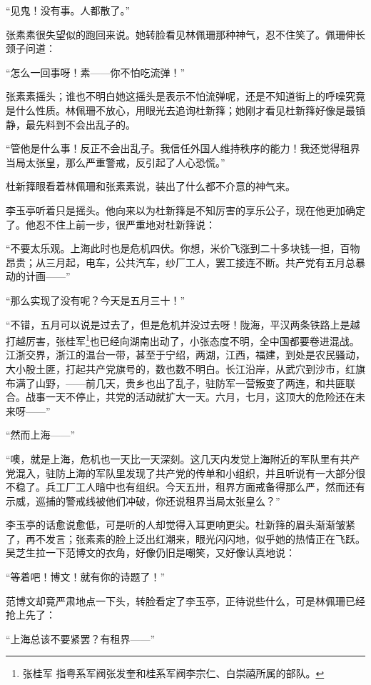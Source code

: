 \par “见鬼！没有事。人都散了。”
\par 张素素很失望似的跑回来说。她转脸看见林佩珊那种神气，忍不住笑了。佩珊伸长颈子问道：
\par “怎么一回事呀！素——你不怕吃流弹！”
\par 张素素摇头；谁也不明白她这摇头是表示不怕流弹呢，还是不知道街上的呼噪究竟是什么性质。林佩珊不放心，用眼光去追询杜新箨；她刚才看见杜新箨好像是最镇静，最先料到不会出乱子的。
\par “管他是什么事！反正不会出乱子。我信任外国人维持秩序的能力！我还觉得租界当局太张皇，那么严重警戒，反引起了人心恐慌。”
\par 杜新箨眼看着林佩珊和张素素说，装出了什么都不介意的神气来。
\par 李玉亭听着只是摇头。他向来以为杜新箨是不知厉害的享乐公子，现在他更加确定了。他忍不住上前一步，很严重地对杜新箨说：
\par “不要太乐观。上海此时也是危机四伏。你想，米价飞涨到二十多块钱一担，百物昂贵；从三月起，电车，公共汽车，纱厂工人，罢工接连不断。共产党有五月总暴动的计画——”
\par “那么实现了没有呢？今天是五月三十！”
\par “不错，五月可以说是过去了，但是危机并没过去呀！陇海，平汉两条铁路上是越打越厉害，张桂军\footnote{张桂军 指粤系军阀张发奎和桂系军阀李宗仁、白崇禧所属的部队。}也已经向湖南出动了，小张态度不明，全中国都要卷进混战。江浙交界，浙江的温台一带，甚至于宁绍，两湖，江西，福建，到处是农民骚动，大小股土匪，打起共产党旗号的，数也数不明白。长江沿岸，从武穴到沙市，红旗布满了山野，——前几天，贵乡也出了乱子，驻防军一营叛变了两连，和共匪联合。战事一天不停止，共党的活动就扩大一天。六月，七月，这顶大的危险还在未来呀——”
\par “然而上海——”
\par “噢，就是上海，危机也一天比一天深刻。这几天内发觉上海附近的军队里有共产党混入，驻防上海的军队里发现了共产党的传单和小组织，并且听说有一大部分很不稳了。兵工厂工人暗中也有组织。今天五卅，租界方面戒备得那么严，然而还有示威，巡捕的警戒线被他们冲破，你还说租界当局太张皇么？”
\par 李玉亭的话愈说愈低，可是听的人却觉得入耳更响更尖。杜新箨的眉头渐渐皱紧了，再不发言；张素素的脸上泛出红潮来，眼光闪闪地，似乎她的热情正在飞跃。吴芝生拉一下范博文的衣角，好像仍旧是嘲笑，又好像认真地说：
\par “等着吧！博文！就有你的诗题了！”
\par 范博文却竟严肃地点一下头，转脸看定了李玉亭，正待说些什么，可是林佩珊已经抢上先了：
\par “上海总该不要紧罢？有租界——”

